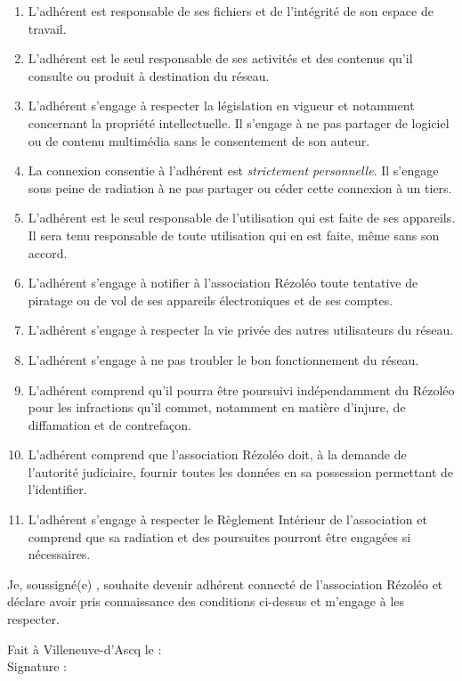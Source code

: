 \documentclass[11pt, a4paper]{article}
\begin{document}
\begin{enumerate}

\item L'adhérent est responsable de ses fichiers et de l'intégrité de son espace de travail.

\item L'adhérent est le seul responsable de ses activités et des contenus qu'il consulte ou produit à destination du réseau.

\item L'adhérent s'engage à respecter la législation en vigueur et notamment concernant la propriété intellectuelle. Il s'engage à ne pas partager de logiciel ou de contenu multimédia sans le consentement de son auteur.

\item La connexion consentie à l'adhérent est \textit{strictement personnelle}. Il s'engage sous peine de radiation à ne pas partager ou céder cette connexion à un tiers.

\item L'adhérent est le seul responsable de l'utilisation qui est faite de ses appareils. Il sera tenu responsable de toute utilisation qui en est faite, même sans son accord.

\item L'adhérent s'engage à notifier à l'association Rézoléo toute tentative de piratage ou de vol de ses appareils électroniques et de ses comptes.

\item L'adhérent s'engage à respecter la vie privée des autres utilisateurs du réseau.

\item L'adhérent s'engage à ne pas troubler le bon fonctionnement du réseau.

\item L'adhérent comprend qu'il pourra être poursuivi indépendamment du Rézoléo pour les infractions qu'il commet, notamment en matière d'injure, de diffamation et de contrefaçon.

\item L'adhérent comprend que l'association Rézoléo doit, à la demande de l'autorité judiciaire, fournir toutes les données en sa possession permettant de l'identifier.

\item L'adhérent s'engage à respecter le Règlement Intérieur de l'association  et comprend que sa radiation et des poursuites pourront être engagées si nécessaires.

\end{enumerate}

\vspace*{0.5cm}

\noindent Je, soussigné(e) \makebox[75mm]{\dotfill}, souhaite devenir adhérent connecté de l'association Rézoléo et déclare avoir pris connaissance des conditions ci-dessus et m'engage à les respecter.

\begin{flushright}
	\begin{minipage}{0.5\linewidth}
		Fait à Villeneuve-d'Ascq le : \dotfill\\
		Signature :
	\end{minipage}
\end{flushright}
\end{document}
